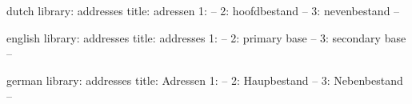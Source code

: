 

\unprotect

\startmessages  dutch  library: addresses
  title: adressen
      1: --
      2: hoofdbestand --
      3: nevenbestand --
\stopmessages

\startmessages  english  library: addresses
  title: addresses
      1: --
      2: primary base --
      3: secondary base --
\stopmessages

\startmessages  german  library: addresses
  title: Adressen
      1: --
      2: Haupbestand --
      3: Nebenbestand --
\stopmessages


